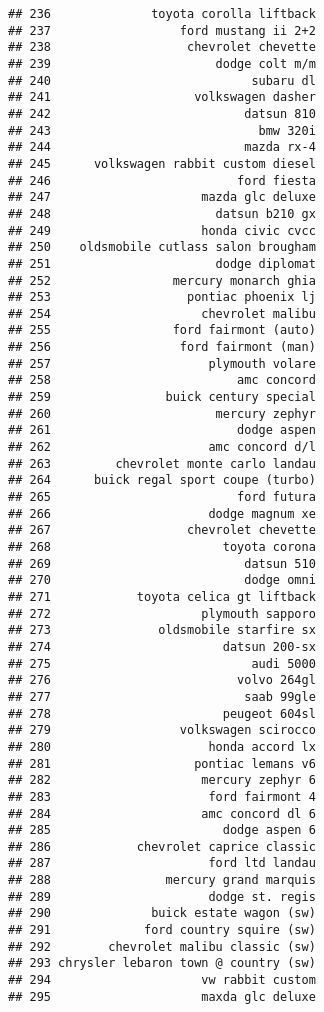 \documentclass[
]{article}
\begin{document}
\begin{verbatim}
## 236              toyota corolla liftback
## 237                  ford mustang ii 2+2
## 238                   chevrolet chevette
## 239                       dodge colt m/m
## 240                            subaru dl
## 241                    volkswagen dasher
## 242                           datsun 810
## 243                             bmw 320i
## 244                           mazda rx-4
## 245      volkswagen rabbit custom diesel
## 246                          ford fiesta
## 247                     mazda glc deluxe
## 248                       datsun b210 gx
## 249                     honda civic cvcc
## 250    oldsmobile cutlass salon brougham
## 251                       dodge diplomat
## 252                 mercury monarch ghia
## 253                   pontiac phoenix lj
## 254                     chevrolet malibu
## 255                 ford fairmont (auto)
## 256                  ford fairmont (man)
## 257                      plymouth volare
## 258                          amc concord
## 259                buick century special
## 260                       mercury zephyr
## 261                          dodge aspen
## 262                      amc concord d/l
## 263         chevrolet monte carlo landau
## 264      buick regal sport coupe (turbo)
## 265                          ford futura
## 266                      dodge magnum xe
## 267                   chevrolet chevette
## 268                        toyota corona
## 269                           datsun 510
## 270                           dodge omni
## 271            toyota celica gt liftback
## 272                     plymouth sapporo
## 273               oldsmobile starfire sx
## 274                        datsun 200-sx
## 275                            audi 5000
## 276                          volvo 264gl
## 277                           saab 99gle
## 278                        peugeot 604sl
## 279                  volkswagen scirocco
## 280                      honda accord lx
## 281                    pontiac lemans v6
## 282                     mercury zephyr 6
## 283                      ford fairmont 4
## 284                     amc concord dl 6
## 285                        dodge aspen 6
## 286            chevrolet caprice classic
## 287                      ford ltd landau
## 288                mercury grand marquis
## 289                      dodge st. regis
## 290              buick estate wagon (sw)
## 291             ford country squire (sw)
## 292        chevrolet malibu classic (sw)
## 293 chrysler lebaron town @ country (sw)
## 294                     vw rabbit custom
## 295                     maxda glc deluxe

\end{verbatim}
\end{document}
